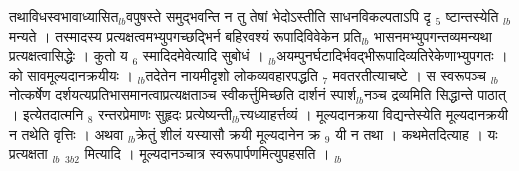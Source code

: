 \documentclass[article,12pt,a4paper]{memoir}%
\newcounter{parCount}
\begin{document}
तथाविधस्वभावाध्यासित{\tiny $_{lb}$}वपुषस्ते समुद्भवन्ति न तु तेषां भेदोऽस्तीति साधनविकल्पताऽपि दृ {\tiny $_{5}$} ष्टान्तस्येति {\tiny $_{lb}$}मन्यते । तस्मादस्य प्रत्यक्षत्वमभ्युपगच्छद्भिर्न बहिरवश्यं रूपादिविवेकेन प्रति{\tiny $_{lb}$} \leavevmode{} भासनमभ्युपगन्तव्यमन्यथा प्रत्यक्षत्वासिद्धेः । कुतो य {\tiny $_{6}$} स्मादिदमेवेत्यादि सुबोधं । {\tiny $_{lb}$}अयम्पुनर्घटादिर्भवद्भीरूपादिव्यतिरेकेणाभ्युपगतः । को सावमूल्यदानक्रयीयः । {\tiny $_{lb}$}तदेतेन नायमीदृशो लोकव्यवहारपद्धति {\tiny $_{7}$} मवतरतीत्याचष्टे । स स्वरूपञ्च {\tiny $_{lb}$}नोत्कर्षेण दर्शयत्यप्रतिभासमानत्वाप्रत्यक्षताञ्च स्वीकर्त्तुमिच्छति दार्शनं स्पार्श{\tiny $_{lb}$}नञ्च द्रव्यमिति सिद्धान्ते पाठात् । इत्येतदात्मनि {\tiny $_{8}$} रन्तरप्रेमाणः सुहृदः प्रत्येष्यन्ती{\tiny $_{lb}$}त्त्यध्याहर्त्तव्यं । मूल्यदानक्रया विद्यन्तेस्येति मूल्यदानक्रयी न तथेति वृत्तिः । अथवा {\tiny $_{lb}$}क्रेतुं शीलं यस्यासौ क्रयी मूल्यदानेन क्र {\tiny $_{9}$} \leavevmode{} यी न तथा । कथमेतदित्याह । {\color{DodgerBlue3}यः प्रत्यक्षता} {\tiny $_{lb}$} {\tiny $_{3b2}$} मित्यादि । मूल्यदानञ्चात्र स्वरूपार्पणमित्युपहसति ।
	{}
	\pend%
      {\tiny $_{lb}$}
\end{document}
